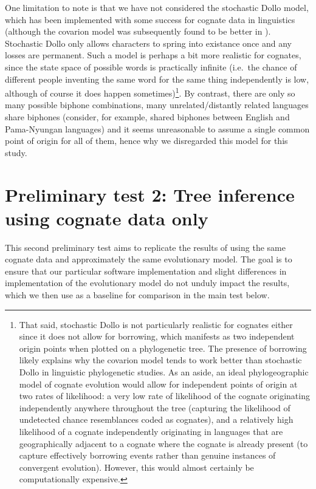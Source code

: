 \documentclass[]{article}
\begin{document}
One limitation to note is that we have not considered the stochastic Dollo model, which has been implemented with some success for cognate data in linguistics \autocite{bowern_computational_2012} (although the covarion model was subsequently found to be better in \textcite{bouckaert_origin_2018}). Stochastic Dollo only allows characters to spring into existance once and any losses are permanent. Such a model is perhaps a bit more realistic for cognates, since the state space of possible words is practically infinite (i.e.~the chance of different people inventing the same word for the same thing independently is low, although of course it does happen sometimes)\footnote{That said, stochastic Dollo is not particularly realistic for cognates either since it does not allow for borrowing, which manifests as two independent origin points when plotted on a phylogenetic tree. The presence of borrowing likely explains why the covarion model tends to work better than stochastic Dollo in linguistic phylogenetic studies. As an aside, an ideal phylogeographic model of cognate evolution would allow for independent points of origin at two rates of likelihood: a very low rate of likelihood of the cognate originating independently anywhere throughout the tree (capturing the likelihood of undetected chance resemblances coded as cognates), and a relatively high likelihood of a cognate independently originating in languages that are geographically adjacent to a cognate where the cognate is already present (to capture effectively borrowing events rather than genuine instances of convergent evolution). However, this would almost certainly be computationally expensive.}. By contrast, there are only so many possible biphone combinations, many unrelated/distantly related languages share biphones (consider, for example, shared biphones between English and Pama-Nyungan languages) and it seems unreasonable to assume a single common point of origin for all of them, hence why we disregarded this model for this study.

\hypertarget{prelim-2}{%
\section{Preliminary test 2: Tree inference using cognate data only}\label{prelim-2}}

This second preliminary test aims to replicate the results of \textcite{bouckaert_origin_2018} using the same cognate data and approximately the same evolutionary model. The goal is to ensure that our particular software implementation and slight differences in implementation of the evolutionary model do not unduly impact the results, which we then use as a baseline for comparison in the main test below.
\end{document}

